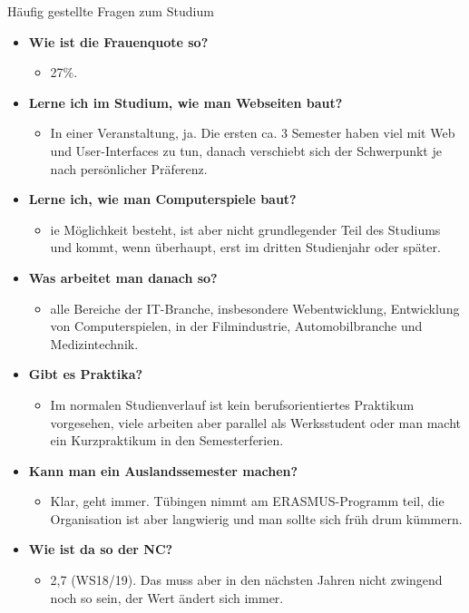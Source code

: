 \begin{block}{Häufig gestellte Fragen zum Studium}
\begin{large}
\begin{itemize}
\item \textbf{Wie ist die Frauenquote so?}
\begin{itemize}
	\item 27\%.
\end{itemize}

\item \textbf{Lerne ich im Studium, wie man Webseiten baut?}
\begin{itemize}
	\item In einer Veranstaltung, ja. Die ersten ca. 3 Semester haben viel mit Web und User-Interfaces zu tun, danach verschiebt sich der Schwerpunkt je nach persönlicher Präferenz.
\end{itemize}

\item \textbf{Lerne ich, wie man Computerspiele baut?}
\begin{itemize}
	\item ie Möglichkeit besteht, ist aber nicht grundlegender Teil des Studiums und kommt, wenn überhaupt, erst im dritten Studienjahr oder später.
\end{itemize}

\item \textbf{Was arbeitet man danach so?}
\begin{itemize}
	\item alle Bereiche der IT-Branche, insbesondere Webentwicklung, Entwicklung von Computerspielen, in der Filmindustrie, Automobilbranche und Medizintechnik.
\end{itemize}

\item \textbf{Gibt es Praktika?}
\begin{itemize}
	\item Im normalen Studienverlauf ist kein berufsorientiertes Praktikum vorgesehen, viele arbeiten aber parallel als Werksstudent oder man macht ein Kurzpraktikum in den Semesterferien.
\end{itemize}

\item \textbf{Kann man ein Auslandssemester machen?}
\begin{itemize}
	\item Klar, geht immer. Tübingen nimmt am ERASMUS-Programm teil, die Organisation ist aber langwierig und man sollte sich früh drum kümmern.
\end{itemize}

\item \textbf{Wie ist da so der NC?}
\begin{itemize}
	\item 2,7 (WS18/19). Das muss aber in den nächsten Jahren nicht zwingend noch so sein, der Wert ändert sich immer.
\end{itemize}

\end{itemize}

\end{large}
\end{block}